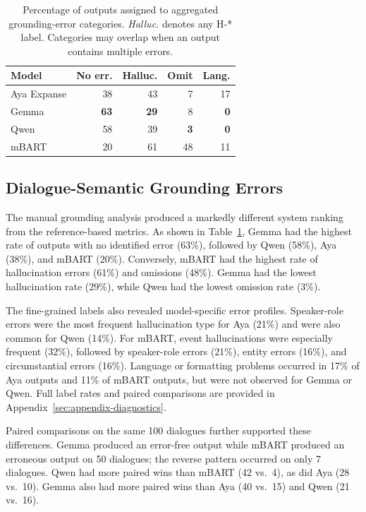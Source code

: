 \documentclass[11pt]{article}
\begin{document}
\begin{table}[H]
\centering
\small
\begin{tabular}{lrrrr}
\hline
Model & No err. & Halluc. & Omit & Lang. \\
\hline
Aya Expanse & 38 & 43 & 7 & 17 \\
Gemma       & \textbf{63} & \textbf{29} & 8 & \textbf{0} \\
Qwen        & 58 & 39 & \textbf{3} & \textbf{0} \\
mBART       & 20 & 61 & 48 & 11 \\
\hline
\end{tabular}
\caption{Percentage of outputs assigned to aggregated grounding-error categories. \textit{Halluc.} denotes any \textsc{H-*} label. Categories may overlap when an output contains multiple errors.}
\label{tab:grounding-results}
\end{table}

\subsection{Dialogue-Semantic Grounding Errors}

The manual grounding analysis produced a markedly different system ranking from the reference-based metrics. As shown in Table~\ref{tab:grounding-results}, Gemma had the highest rate of outputs with no identified error (63\%), followed by Qwen (58\%), Aya (38\%), and mBART (20\%). Conversely, mBART had the highest rate of hallucination errors (61\%) and omissions (48\%). Gemma had the lowest hallucination rate (29\%), while Qwen had the lowest omission rate (3\%).

The fine-grained labels also revealed model-specific error profiles. Speaker-role errors were the most frequent hallucination type for Aya (21\%) and were also common for Qwen (14\%). For mBART, event hallucinations were especially frequent (32\%), followed by speaker-role errors (21\%), entity errors (16\%), and circumstantial errors (16\%). Language or formatting problems occurred in 17\% of Aya outputs and 11\% of mBART outputs, but were not observed for Gemma or Qwen. Full label rates and paired comparisons are provided in Appendix~\ref{sec:appendix-diagnostics}.

Paired comparisons on the same 100 dialogues further supported these differences. Gemma produced an error-free output while mBART produced an erroneous output on 50 dialogues; the reverse pattern occurred on only 7 dialogues. Qwen had more paired wins than mBART (42 vs.\ 4), as did Aya (28 vs.\ 10). Gemma also had more paired wins than Aya (40 vs.\ 15) and Qwen (21 vs.\ 16).
\end{document}
